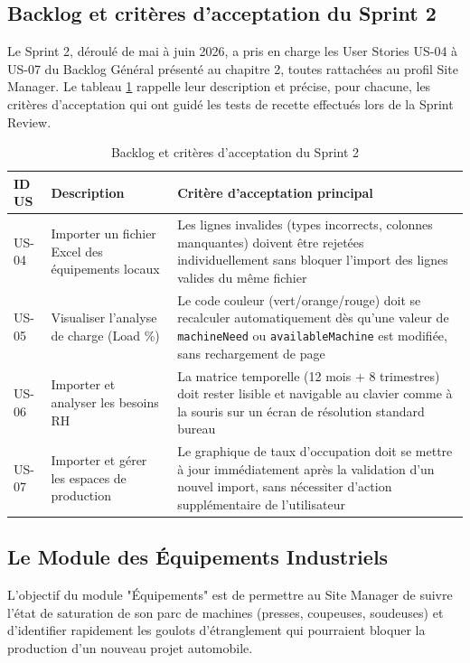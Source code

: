 \subsection{Backlog et critères d'acceptation du Sprint 2}
Le Sprint 2, déroulé de mai à juin 2026, a pris en charge les User Stories US-04 à US-07 du Backlog Général présenté au chapitre 2, toutes rattachées au profil Site Manager. Le tableau \ref{tab:backlog_sprint2} rappelle leur description et précise, pour chacune, les critères d'acceptation qui ont guidé les tests de recette effectués lors de la Sprint Review.

\begin{table}[h]
\centering
\begin{tabular}{|p{1.6cm}|p{6cm}|p{7cm}|}
\hline
\textbf{ID US} & \textbf{Description} & \textbf{Critère d'acceptation principal} \\ \hline
US-04 & Importer un fichier Excel des équipements locaux & Les lignes invalides (types incorrects, colonnes manquantes) doivent être rejetées individuellement sans bloquer l'import des lignes valides du même fichier \\ \hline
US-05 & Visualiser l'analyse de charge (Load \%) & Le code couleur (vert/orange/rouge) doit se recalculer automatiquement dès qu'une valeur de \texttt{machineNeed} ou \texttt{availableMachine} est modifiée, sans rechargement de page \\ \hline
US-06 & Importer et analyser les besoins RH & La matrice temporelle (12 mois + 8 trimestres) doit rester lisible et navigable au clavier comme à la souris sur un écran de résolution standard bureau \\ \hline
US-07 & Importer et gérer les espaces de production & Le graphique de taux d'occupation doit se mettre à jour immédiatement après la validation d'un nouvel import, sans nécessiter d'action supplémentaire de l'utilisateur \\ \hline
\end{tabular}
\caption{Backlog et critères d'acceptation du Sprint 2}
\label{tab:backlog_sprint2}
\end{table}

\subsection{Le Module des Équipements Industriels}
L'objectif du module "Équipements" est de permettre au Site Manager de suivre l'état de saturation de son parc de machines (presses, coupeuses, soudeuses) et d'identifier rapidement les goulots d'étranglement qui pourraient bloquer la production d'un nouveau projet automobile.

